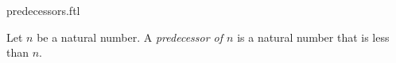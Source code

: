 \documentclass{stex}
\begin{document}
\begin{smodule}{predecessors.ftl}


\begin{definition}[forthel,id=PredecessorDef]
  Let $n$ be a natural number.
  A \emph{predecessor of $n$} is a natural number that is less than $n$.
\end{definition}

\end{smodule}
\end{document}

